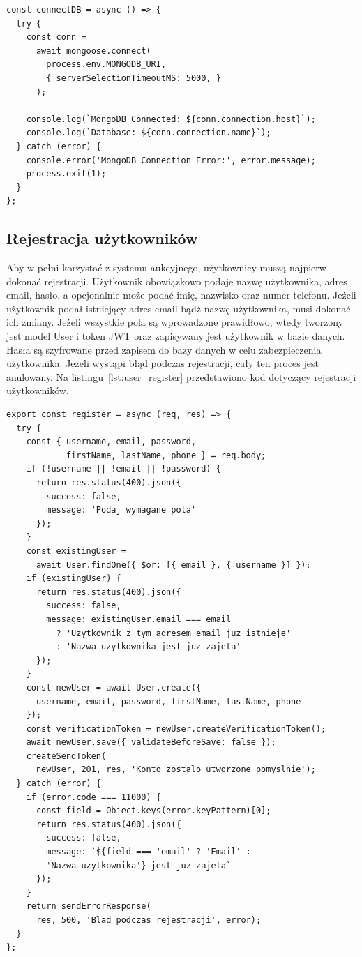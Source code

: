 \begin{lstlisting}[style=javascript, caption = {Konfiguracja połączenia z bazą danych}, label = {lst:database_config}]
const connectDB = async () => {
  try {
    const conn = 
      await mongoose.connect( 
        process.env.MONGODB_URI, 
        { serverSelectionTimeoutMS: 5000, }
      );

    console.log(`MongoDB Connected: ${conn.connection.host}`);
    console.log(`Database: ${conn.connection.name}`);
  } catch (error) {
    console.error('MongoDB Connection Error:', error.message);
    process.exit(1);
  }
};
\end{lstlisting}


\subsection{Rejestracja użytkowników}
Aby w pełni korzystać z systemu aukcyjnego, użytkownicy muszą najpierw dokonać rejestracji. Użytkownik obowiązkowo podaje nazwę użytkownika, adres email, hasło, a opcjonalnie może podać imię, nazwisko oraz numer telefonu. Jeżeli użytkownik podał istniejący adres email bądź nazwę użytkownika, musi dokonać ich zmiany. Jeżeli wszystkie pola są wprowadzone prawidłowo, wtedy tworzony jest model User i token JWT oraz zapisywany jest użytkownik w bazie danych. Hasła są szyfrowane przed zapisem do bazy danych w celu zabezpieczenia użytkownika. Jeżeli wystąpi błąd podczas rejestracji, cały ten proces jest anulowany. Na listingu~\ref{lst:user_register} przedstawiono kod dotyczący rejestracji użytkowników.

\begin{lstlisting}[style=javascript, caption = {Implementacja procesu rejestracji użytkownika}, label = {lst:user_register}]
export const register = async (req, res) => {
  try {
    const {	username, email, password, 
    		firstName, lastName, phone } = req.body;
    if (!username || !email || !password) {
      return res.status(400).json({
        success: false,
        message: 'Podaj wymagane pola'
      });
    }
    const existingUser = 
      await User.findOne({ $or: [{ email }, { username }] });
    if (existingUser) {
      return res.status(400).json({
        success: false,
        message: existingUser.email === email
          ? 'Uzytkownik z tym adresem email juz istnieje'
          : 'Nazwa uzytkownika jest juz zajeta'
      });
    }
    const newUser = await User.create({
      username, email, password, firstName, lastName, phone
    });
    const verificationToken = newUser.createVerificationToken();
    await newUser.save({ validateBeforeSave: false });
    createSendToken(
      newUser, 201, res, 'Konto zostalo utworzone pomyslnie');  
  } catch (error) {
    if (error.code === 11000) {
      const field = Object.keys(error.keyPattern)[0];
      return res.status(400).json({
        success: false,
        message: `${field === 'email' ? 'Email' : 
        'Nazwa uzytkownika'} jest juz zajeta`
      });
    }    
    return sendErrorResponse(
      res, 500, 'Blad podczas rejestracji', error);
  }
};
\end{lstlisting}

